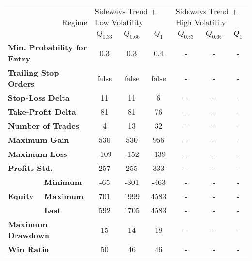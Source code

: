 \centering
\begin{tabular}{ll|cccccc}
    \toprule
    \multicolumn{2}{r|}{\multirow{2}{*}{Regime}} & \multicolumn{3}{l}{Sideways Trend + Low Volatility} & \multicolumn{3}{l}{Sideways Trend + High Volatility}  \\
    \multicolumn{2}{r|}{} & $Q_{0.33}$ & $Q_{0.66}$ & $Q_{1}$ & $Q_{0.33}$ & $Q_{0.66}$ & $Q_{1}$ \\
    \midrule
    \multicolumn{2}{l|}{\textbf{Min. Probability for Entry}} & 0.3 & 0.3 & 0.4 & - & - & - \\
    \multicolumn{2}{l|}{\textbf{Trailing Stop Orders}} & false & false & false & - & - & - \\
    \multicolumn{2}{l|}{\textbf{Stop-Loss Delta}} & 11 & 11 & 6 & - & - & - \\
    \multicolumn{2}{l|}{\textbf{Take-Profit Delta}} & 81 & 81 & 76 & - & - & - \\
    \midrule
    \multicolumn{2}{l|}{\textbf{Number of Trades}} & 4 & 13 & 32 & - & - & - \\
    \multicolumn{2}{l|}{\textbf{Maximum Gain}} & 530 & 530 & 956 & - & - & - \\
    \multicolumn{2}{l|}{\textbf{Maximum Loss}} & -109 & -152 & -139 & - & - & - \\
    \multicolumn{2}{l|}{\textbf{Profits Std.}} & 257 & 255 & 333 & - & - & - \\
    \multirow{3}{*}{\textbf{Equity}} & \textbf{Minimum} & -65 & -301 & -463 & - & - & - \\
    & \textbf{Maximum} & 701 & 1999 & 4583 & - & - & - \\
    & \textbf{Last}    & 592 & 1705 & 4583 & - & - & - \\
    \multicolumn{2}{l|}{\textbf{Maximum Drawdown}} & 15 & 14 & 18 & - & - & - \\
    \multicolumn{2}{l|}{\textbf{Win Ratio}} & 50 & 46 & 46 & - & - & - \\
    \bottomrule
\end{tabular}